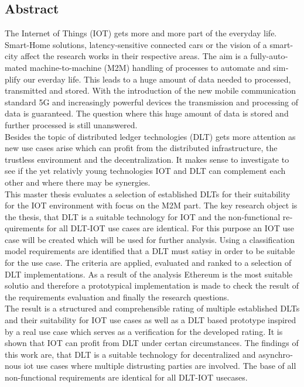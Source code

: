 

\begin{otherlanguage}{american}
	\chapter*{Abstract}
	The Internet of Things (IOT) gets more and more part of the everyday life. Smart-Home solutions, latency-sensitive connected cars or the vision of a smart-city affect the research works in their respective areas. The aim is a fully-automated machine-to-machine (M2M) handling of processes to automate and simplify our everday life. This leads to a huge amount of data needed to processed, transmitted and stored. With the introduction of the new mobile communication standard 5G and increasingly powerful devices the transmission and processing of data is guaranteed. The question where this huge amount of data is stored and further processed is still unanswered.\\
	Besides the topic of distributed ledger technologies (DLT) gets more attention as new use cases arise which can profit from the distributed infrastructure, the trustless environment and the decentralization. It makes sense to investigate to see if the yet relativly young technologies IOT and DLT can complement each other and where there may be synergies.\\
	This master thesis evaluates a selection of established DLTs for their suitability for the IOT environment with focus on the M2M part. The key research object is the thesis, that DLT is a suitable technology for IOT and the non-functional requirements for all DLT-IOT use cases are identical. For this purpose an IOT use case will be created which will be used for further analysis. Using a classification model requirements are identified that a DLT must satisy in order to be suitable for the use case. The criteria are applied, evaluated and ranked to a selection of DLT implementations. As a result of the analysis Ethereum is the most suitable solutio and therefore a prototypical implementation is made to check the result of the requirements evaluation and finally the research questions.\\
	The result is a structured and comprehensible rating of multiple established DLTs and their suitability for IOT use cases as well as a DLT based prototype inspired by a real use case which serves as a verification for the developed rating. It is shown that IOT can profit from DLT under certan circumstances. The findings of this work are, that DLT is a suitable technology for decentralized and asynchronous iot use cases where multiple distrusting parties are involved. The base of all non-functional requirements are identical for all DLT-IOT usecases.
\end{otherlanguage}
